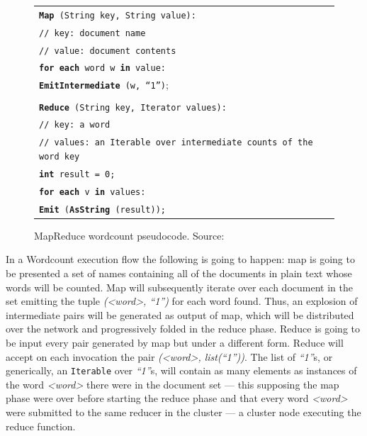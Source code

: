 \begin{figure}[tbp]
 \begin{center}
  \begin{tabular}{|l|}
   \hline
   \texttt{{\bf Map} (String key, String value):} \\
   \texttt{// key: document name} \\
   \texttt{// value: document contents} \\
   \texttt{{\bf for each} word w {\bf in} value:} \\
   \texttt{{\bf EmitIntermediate} (w, ``1'')};\\ \\

   \texttt{{\bf Reduce} (String key, Iterator values):} \\
   \texttt{// key: a word} \\
   \texttt{// values: an Iterable over intermediate counts of the word key} \\
   \texttt{{\bf int} result = 0;} \\
   \texttt{{\bf for each} v {\bf in} values:} \\
   \texttt{{\bf Emit} ({\bf AsString} (result));} \\
   \hline
  \end{tabular}
  \caption{MapReduce wordcount pseudocode. Source: \cite{googlemapreduce}}
  \label{fig:wordcount}
 \end{center}
\end{figure}

In a Wordcount execution flow the following is going to happen: map is going to be presented a set of names containing all of the documents in plain text whose words will be counted. Map will subsequently iterate over each document in the set emitting the tuple \emph{(<word>, ``1'')} for each word found. Thus, an explosion of intermediate pairs will be generated as output of map, which will be distributed over the network and progressively folded in the reduce phase. Reduce is going to be input every pair generated by map but under a different form. Reduce will accept on each invocation the pair \emph{(<word>, list(``1''))}. The list of \emph{``1''}s, or generically, an \texttt{Iterable} over \emph{``1''}s, will contain as many elements as instances of the word \emph{<word>} there were in the document set --- this supposing the map phase were over before starting the reduce phase and that every word \emph{<word>} were submitted to the same reducer in the cluster --- a cluster node executing the reduce function.

